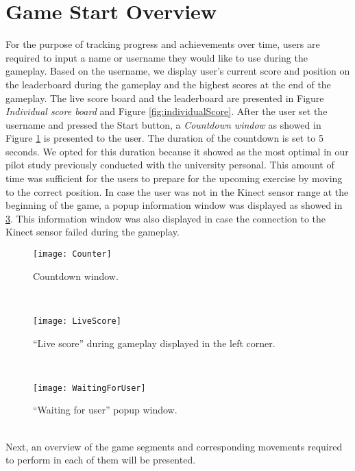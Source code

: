 \section{Game Start Overview}
For the purpose of tracking progress and achievements over time, users are required to input a name or username they would like to use during the gameplay. Based on the username, we display user's current score and position on the leaderboard during the gameplay and the highest scores at the end of the gameplay. The live score board and the leaderboard are presented  in Figure \textit{Individual score board} and Figure \ref{fig:individualScore}. After the user set the username and pressed the Start button, a \textit{Countdown window} as showed in Figure \ref{fig:counter} is presented to the user. The duration of the countdown is set to 5 seconds. We opted for this duration because it showed as the most optimal in our pilot study previously conducted with the university personal. This amount of time was sufficient for the users to prepare for the upcoming exercise by moving to the correct position. In case the user was not in the Kinect sensor range at the beginning of the game, a popup information window was displayed as showed in \ref{fig:waiting}. This information window was also displayed in case the connection to the Kinect sensor failed during the gameplay. \\
\begin{figure}[h]
    \centering
    \texttt{[image: Counter]}
    \caption{Countdown window.}
    \label{fig:counter}
\end{figure}\\
\begin{figure}[h]
    \centering
    \texttt{[image: LiveScore]}
    \caption{``Live score'' during gameplay displayed in the left corner.}
    \label{fig:livescore}
\end{figure}\\
\begin{figure}[h]
    \centering
    \texttt{[image: WaitingForUser]}
    \caption{``Waiting for user'' popup window.}
    \label{fig:waiting}
\end{figure}\\
Next, an overview of the game segments and corresponding movements required to perform in each of them will be presented.
